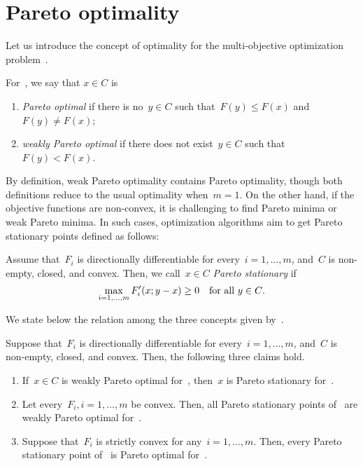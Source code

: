 \documentclass[../main]{subfiles}
\begin{document}
\section{Pareto optimality}
Let us introduce the concept of optimality for the multi-objective optimization problem~.
\begin{definition} 
    For~, we say that $x \in C$ is
    \begin{enumerate}
        \item \emph{Pareto optimal} if there is no~$y \in C$ such that~$F(y) \le F(x)$ and~$F(y) \neq F(x)$; 
        \item \emph{weakly Pareto optimal} if there does not exist~$y \in C$ such that~$F(y) < F(x)$. 
    \end{enumerate}
\end{definition}
By definition, weak Pareto optimality contains Pareto optimality, though both definitions reduce to the usual optimality when~$m = 1$.
On the other hand, if the objective functions are non-convex, it is challenging to find Pareto minima or weak Pareto minima.
In such cases, optimization algorithms aim to get Pareto stationary points defined as follows:
\begin{definition} 
    Assume that~$F_i$ is directionally differentiable for every~$i = 1, \dots, m$, and~$C$ is non-empty, closed, and convex.
    Then, we call~$x \in C$ \emph{Pareto stationary} if~
    \begin{equation}
        \max_{i = 1, \dots, m} F_i'(x; y - x) \ge 0 \quad \text{for all~$y \in C$}
    .\end{equation} 
\end{definition}
We state below the relation among the three concepts given by~.
\begin{lemma} 
    Suppose that~$F_i$ is directionally differentiable for every~$i = 1, \dots, m$, and~$C$ is non-empty, closed, and convex.
    Then, the following three claims hold.
    \begin{enumerate}
        \item If~$x \in C$ is weakly Pareto optimal for~, then~$x$ is Pareto stationary for~. 
        \item Let every~$F_i, i = 1, \dots, m$ be convex. Then, all Pareto stationary points of~ are weakly Pareto optimal for~. 
        \item Suppose that~$F_i$ is strictly convex for any~$i = 1, \dots, m$. Then, every Pareto stationary point of~ is Pareto optimal for~. 
    \end{enumerate}
\end{lemma}
\end{document}
